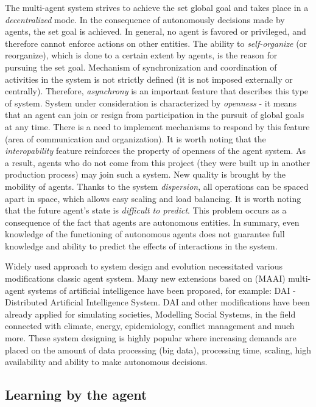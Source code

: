 The multi-agent system strives to achieve the set global goal and takes place in a \textit{decentralized} mode. In the consequence of autonomously decisions made by agents, the set goal is achieved. In general, no agent is favored or privileged, and therefore cannot enforce actions on other entities. The ability to \textit{self-organize} (or reorganize), which is done to a certain extent by agents, is the reason for pursuing the set goal. Mechanism of synchronization and coordination of activities in the system is not strictly defined (it is not imposed externally or centrally). Therefore, \textit{asynchrony} is an important feature that describes this type of system.
System under consideration is characterized by \textit{openness} - it means that an agent can join or resign from participation in the pursuit of global goals at any time. There is a need to implement mechanisms to respond by this feature (area of communication and organization). It is worth noting that the \textit{interopability} feature reinforces the property of openness of the agent system. As a result, agents who do not come from this project (they were built up in another production process) may join such a system. New quality is brought by the mobility of agents. Thanks to the system \textit{dispersion}, all operations can be spaced apart in space, which allows easy scaling and load balancing. It is worth noting that the future agent's state is \textit{difficult to predict}. This problem occurs as a consequence of the fact that agents are autonomous entities. In summary, even knowledge of the functioning of autonomous agents does not guarantee full knowledge and ability to predict the effects of interactions in the system.

Widely used approach to system design and evolution necessitated various modifications classic agent system. Many new extensions based on (MAAI) multi-agent systems of artificial intelligence have been proposed, for example: DAI - Distributed Artificial Intelligence System. DAI and other modifications have been already applied for simulating societies, Modelling Social Systems, in the field connected with climate, energy, epidemiology, conflict management and much more. These system designing is highly popular where increasing demands are placed on the amount of data processing (big data), processing time, scaling, high availability and ability to make autonomous decisions.


\subsection{Learning by the agent}

